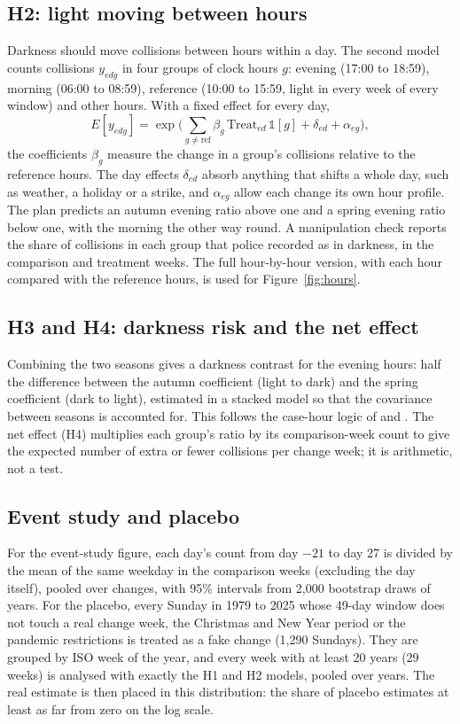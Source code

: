 \documentclass[11pt,a4paper]{article}
\begin{document}
\subsection{H2: light moving between hours}
Darkness should move collisions between hours within a day. The second model counts collisions $y_{edg}$ in four groups of clock hours $g$: evening (17:00 to 18:59), morning (06:00 to 08:59), reference (10:00 to 15:59, light in every week of every window) and other hours. With a fixed effect for every day,
\begin{equation}
E[y_{edg}] = \exp\Big(\sum_{g\neq\text{ref}} \beta_g\,\text{Treat}_{ed}\,\mathbb{1}[g] + \delta_{ed} + \alpha_{eg}\Big),
\end{equation}
the coefficients $\beta_g$ measure the change in a group's collisions relative to the reference hours. The day effects $\delta_{ed}$ absorb anything that shifts a whole day, such as weather, a holiday or a strike, and $\alpha_{eg}$ allow each change its own hour profile. The plan predicts an autumn evening ratio above one and a spring evening ratio below one, with the morning the other way round. A manipulation check reports the share of collisions in each group that police recorded as in darkness, in the comparison and treatment weeks. The full hour-by-hour version, with each hour compared with the reference hours, is used for Figure~\ref{fig:hours}.

\subsection{H3 and H4: darkness risk and the net effect}
Combining the two seasons gives a darkness contrast for the evening hours: half the difference between the autumn coefficient (light to dark) and the spring coefficient (dark to light), estimated in a stacked model so that the covariance between seasons is accounted for. This follows the case-hour logic of \citet{johansson2009} and \citet{sullivan2002}. The net effect (H4) multiplies each group's ratio by its comparison-week count to give the expected number of extra or fewer collisions per change week; it is arithmetic, not a test.

\subsection{Event study and placebo}
For the event-study figure, each day's count from day $-21$ to day 27 is divided by the mean of the same weekday in the comparison weeks (excluding the day itself), pooled over changes, with 95\% intervals from 2,000 bootstrap draws of years. For the placebo, every Sunday in 1979 to 2025 whose 49-day window does not touch a real change week, the Christmas and New Year period or the pandemic restrictions is treated as a fake change (1,290 Sundays). They are grouped by ISO week of the year, and every week with at least 20 years (29 weeks) is analysed with exactly the H1 and H2 models, pooled over years. The real estimate is then placed in this distribution: the share of placebo estimates at least as far from zero on the log scale.
\end{document}
